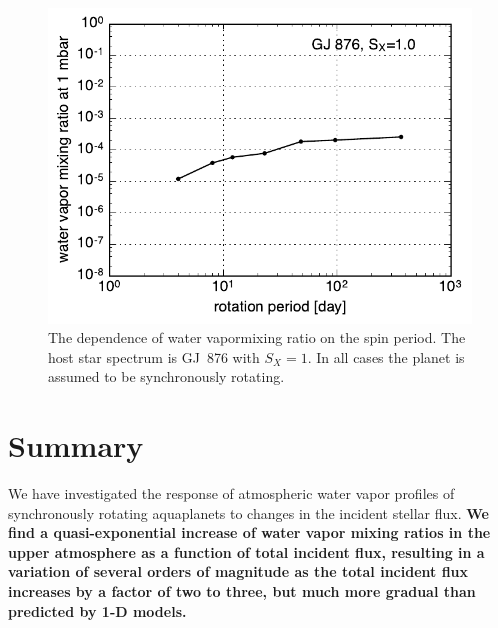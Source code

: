 \documentclass[11pt,numberedappendix,twocolappendix,]{emulateapj}
\def\wv{water vapor}
\def\revise#1{{\bf #1}}
\begin{document}
\begin{figure}[!h]
    \begin{center}
    \includegraphics[width=\hsize]{xH2O_Prot.pdf}
    \end{center}
\caption{The dependence of \wv mixing ratio on the spin period. The host star spectrum is GJ~876 with $S_X=1$. In all cases the planet is assumed to be synchronously rotating. }
\label{fig:changeP}
\end{figure}



\section{Summary}
\label{s:summary}

We have investigated the response of atmospheric \wv{} profiles of synchronously rotating aquaplanets to changes in the incident stellar flux. 
\revise{We find a quasi-exponential increase of \wv{} mixing ratios in the upper atmosphere as a function of total incident flux, resulting in a variation of several orders of magnitude as the total incident flux increases by a factor of two to three,  but much more gradual than predicted by 1-D models. }
\end{document}
